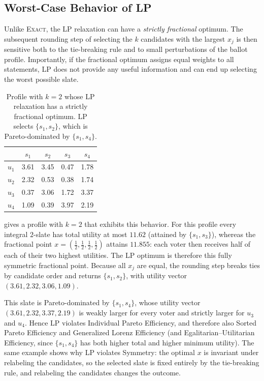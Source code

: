\documentclass[11pt]{article}
\newcommand{\Exact}{\textsc{Exact}}
\newcommand{\LP}{\textsc{LP}}
\begin{document}
\subsection{Worst-Case Behavior of \LP{}}
\label{app:lp-worst}

Unlike \Exact{}, the LP relaxation can have a \emph{strictly fractional}
optimum. The subsequent rounding step of selecting the $k$ candidates with
the largest $x_j$ is then sensitive both to the tie-breaking rule and to
small perturbations of the ballot profile.
Importantly, if the fractional optimum assigns equal weights to all statements,
\LP{} does not provide any useful information and can end up selecting the worst possible slate.

\begin{table}[t]
\centering
\begin{tabular}{lcccc}
\hline
 & $s_1$ & $s_2$ & $s_3$ & $s_4$ \\
\hline
$u_1$ & 3.61 & 3.45 & 0.47 & 1.78 \\
$u_2$ & 2.32 & 0.53 & 0.38 & 1.74 \\
$u_3$ & 0.37 & 3.06 & 1.72 & 3.37 \\
$u_4$ & 1.09 & 0.39 & 3.97 & 2.19 \\
\hline
\end{tabular}
\caption{Profile with $k=2$ whose LP relaxation has a strictly fractional
optimum. \LP{} selects $\{s_1,s_2\}$, which is Pareto-dominated by
$\{s_1,s_4\}$.}
\label{tab:lp-fractional}
\end{table}

 gives a
profile with $k=2$ that exhibits this behavior.
For this profile every integral $2$-slate has total utility at most $11.62$
(attained by $\{s_1,s_3\}$), whereas the fractional point
$x=(\tfrac12,\tfrac12,\tfrac12,\tfrac12)$ attains $11.855$: each voter then
receives half of each of their two highest utilities. The LP optimum is
therefore this fully symmetric fractional point. Because all $x_j$ are
equal, the rounding step breaks ties by candidate order and returns
$\{s_1,s_2\}$, with utility vector $(3.61,2.32,3.06,1.09)$.

This slate is Pareto-dominated by $\{s_1,s_4\}$, whose utility vector
$(3.61,2.32,3.37,2.19)$ is weakly larger for every voter and strictly
larger for $u_3$ and $u_4$. Hence \LP{} violates Individual Pareto
Efficiency, and therefore also Sorted Pareto Efficiency and Generalized
Lorenz Efficiency (and Egalitarian--Utilitarian Efficiency, since
$\{s_1,s_4\}$ has both higher total and higher minimum utility). The same
example shows why \LP{} violates Symmetry: the optimal $x$ is invariant under
relabeling the candidates, so the selected slate is fixed entirely by the
tie-breaking rule, and relabeling the candidates changes the outcome.
\end{document}

